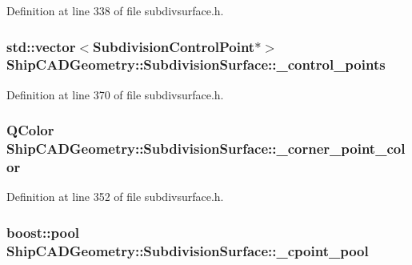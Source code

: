 Definition at line 338 of file subdivsurface.\-h.

\hypertarget{classShipCADGeometry_1_1SubdivisionSurface_a7a1119ec998a0012e11ec7dee63073fc}{
\subsubsection[{\-\_\-control\-\_\-points}]{\setlength{\rightskip}{0pt plus 5cm}std\-::vector$<${\bf Subdivision\-Control\-Point}$\ast$$>$ Ship\-C\-A\-D\-Geometry\-::\-Subdivision\-Surface\-::\-\_\-control\-\_\-points\hspace{0.3cm}{\ttfamily [protected]}}}\label{classShipCADGeometry_1_1SubdivisionSurface_a7a1119ec998a0012e11ec7dee63073fc}


Definition at line 370 of file subdivsurface.\-h.

\hypertarget{classShipCADGeometry_1_1SubdivisionSurface_a1a258a7eb65fd759138f386ca88b158d}{
\subsubsection[{\-\_\-corner\-\_\-point\-\_\-color}]{\setlength{\rightskip}{0pt plus 5cm}Q\-Color Ship\-C\-A\-D\-Geometry\-::\-Subdivision\-Surface\-::\-\_\-corner\-\_\-point\-\_\-color\hspace{0.3cm}{\ttfamily [protected]}}}\label{classShipCADGeometry_1_1SubdivisionSurface_a1a258a7eb65fd759138f386ca88b158d}


Definition at line 352 of file subdivsurface.\-h.

\hypertarget{classShipCADGeometry_1_1SubdivisionSurface_aa9d50a7eea24cebe4e97f5af8dc0c4d8}{
\subsubsection[{\-\_\-cpoint\-\_\-pool}]{\setlength{\rightskip}{0pt plus 5cm}boost\-::pool Ship\-C\-A\-D\-Geometry\-::\-Subdivision\-Surface\-::\-\_\-cpoint\-\_\-pool\hspace{0.3cm}{\ttfamily [protected]}}}\label{classShipCADGeometry_1_1SubdivisionSurface_aa9d50a7eea24cebe4e97f5af8dc0c4d8}


